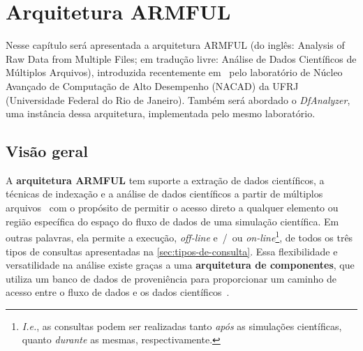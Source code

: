 
\chapter{Arquitetura ARMFUL}%
\label{chap:arquitetura-armful}

Nesse capítulo será apresentada a arquitetura  ARMFUL (do inglês: Analysis of Raw Data from Multiple Files; em tradução livre: Análise de Dados Científicos de Múltiplos Arquivos), introduzida recentemente em~\cite{silva2016situ,silva2017raw} pelo laboratório de  Núcleo Avançado de Computação de Alto Desempenho (NACAD) da  UFRJ (Universidade Federal do Rio de Janeiro). Também será abordado o \textit{DfAnalyzer}, uma instância dessa arquitetura, implementada pelo mesmo laboratório.

\section{Visão geral}

A \textbf{arquitetura ARMFUL} tem suporte a extração de dados científicos, a técnicas de indexação e a análise de dados científicos a partir de múltiplos arquivos~\cite{silva2016situ} com o propósito de permitir o acesso direto a qualquer elemento ou região específica do espaço do fluxo de dados de uma simulação científica. Em outras palavras, ela permite a execução, \textit{off-line} e~/~ou \textit{on-line}\footnote{\textit{I.e.}, as consultas podem ser realizadas tanto \emph{após} as simulações científicas, quanto \emph{durante} as mesmas, respectivamente.}, de todos os três tipos de consultas apresentadas na \autoref{sec:tipos-de-consulta}. Essa flexibilidade e versatilidade na análise existe graças a uma \textbf{arquitetura de componentes}, que utiliza um banco de dados de proveniência para proporcionar um caminho de acesso entre o fluxo de dados e os dados científicos~\cite{silva2017raw}.

